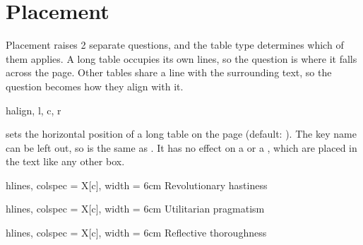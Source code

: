 \section{Placement}\label{outer:placement}
Placement raises 2 separate questions, and the table type determines which of them applies. A long table occupies its own lines, so the question is where it falls across the page. Other tables share a line with the surrounding text, so the question becomes how they align with it.

\begin{codedescribe}[
        key,
        new=2021L
    ]{halign, l, c, r}
    \begin{codesyntax}
    \end{codesyntax}
     sets the horizontal position of a long table on the page (default: ). The key name can be left out, so \vrb{[r]} is the same as \vrb{[halign=r]}. It has no effect on a  or a , which are placed in the text like any other box.
\end{codedescribe}

\begin{codestore}[st=outer:halign]
    \begin{longtblr}[
            l, caption = {France, on the left},
        ]{hlines, colspec = {X[c]}, width = 6cm}
        Revolutionary hastiness
    \end{longtblr}
    \begin{longtblr}[
            caption = {England, by default},
        ]{hlines, colspec = {X[c]}, width = 6cm}
        Utilitarian pragmatism
    \end{longtblr}
    \begin{longtblr}[
            r, caption = {Germany, on the right},
        ]{hlines, colspec = {X[c]}, width = 6cm}
        Reflective thoroughness
    \end{longtblr}\end{codestore}

